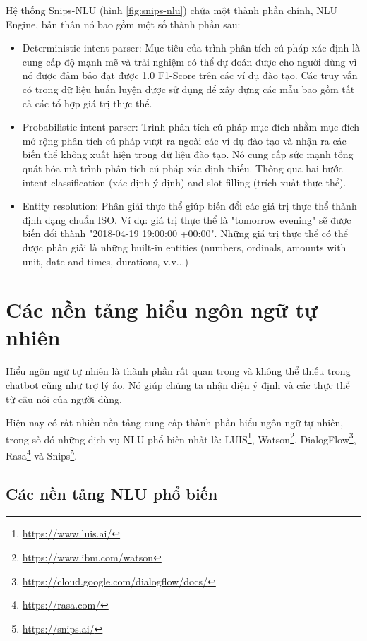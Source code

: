 \begin{itemize}
          Hệ thống Snips-NLU (hình \ref{fig:snips-nlu}) chứa một thành phần chính, NLU Engine, bản thân nó bao gồm một số thành phần sau:
          \begin{itemize}
              \item Deterministic intent parser: Mục tiêu của trình phân tích cú pháp xác định là cung cấp độ mạnh mẽ và trải nghiệm có thể dự đoán được cho người dùng vì nó được đảm bảo đạt được 1.0 F1-Score trên các ví dụ đào tạo. Các truy vấn có trong dữ liệu huấn luyện được sử dụng để xây dựng các mẫu bao gồm tất cả các tổ hợp giá trị thực thể.
              \item Probabilistic intent parser: Trình phân tích cú pháp mục đích nhằm mục đích mở rộng phân tích cú pháp vượt ra ngoài các ví dụ đào tạo và nhận ra các biến thể không xuất hiện trong dữ liệu đào tạo. Nó cung cấp sức mạnh tổng quát hóa mà trình phân tích cú pháp xác định thiếu. Thông qua hai bước intent classification (xác định ý định) and slot filling (trích xuất thực thể).
              \item Entity resolution: Phân giải thực thể giúp biến đổi các giá trị thực thể thành định dạng chuẩn ISO. Ví dụ: giá trị thực thể là "tomorrow evening" sẽ được biến đổi thành "2018-04-19 19:00:00 +00:00". Những giá trị thực thể có thể được phân giải là những built-in entities (numbers, ordinals, amounts with unit, date and times, durations, v.v...)
          \end{itemize}
\end{itemize}
\section{Các nền tảng hiểu ngôn ngữ tự nhiên}

Hiểu ngôn ngữ tự nhiên là thành phần rất quan trọng và không thể thiếu trong chatbot cũng như trợ lý ảo. Nó giúp chúng ta nhận diện ý định và các thực thể từ câu nói của người dùng.

Hiện nay có rất nhiều nền tảng cung cấp thành phần hiểu ngôn ngữ tự nhiên, trong số đó những dịch vụ NLU phổ biến nhất là: LUIS\footnote{\url{https://www.luis.ai/}}, Watson\footnote{\url{https://www.ibm.com/watson}}, DialogFlow\footnote{\url{https://cloud.google.com/dialogflow/docs/}}, Rasa\footnote{\url{https://rasa.com/}} và Snips\footnote{\url{https://snips.ai/}}.

\subsection{Các nền tảng NLU phổ biến}


